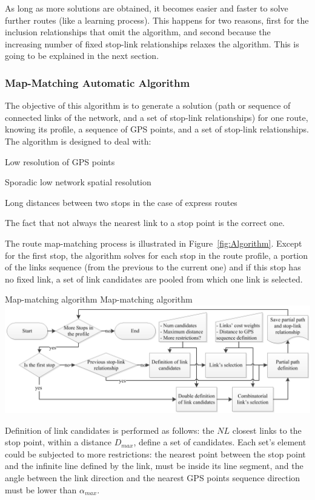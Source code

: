 As long as more solutions are obtained, it becomes easier and faster to solve further routes (like a learning process). This happens for two reasons, first for the inclusion relationships that omit the algorithm, and second because the increasing number of fixed stop-link relationships relaxes the algorithm. This is going to be explained in the next section.

\subsubsection{Map-Matching Automatic Algorithm}
The objective of this algorithm is to generate a solution (path or sequence of connected links of the network, and a set of stop-link relationships) for one route, knowing its profile, a sequence of GPS points, and a set of stop-link relationships. The algorithm is designed to deal with:
%
\begin{compactitem}
\item	Low resolution of GPS points
\item	Sporadic low network spatial resolution
\item	Long distances between two stops in the case of express routes
\item	The fact that not always the nearest link to a stop point is the correct one.
\end{compactitem}

The route map-matching process is illustrated in Figure~\ref{fig:Algorithm}. Except for the first stop, the algorithm solves for each stop in the route profile, a portion of the links sequence (from the previous to the current one) and if this stop has no fixed link, a set of link candidates are pooled from which one link is selected.

\createfigure
{Map-matching algorithm}
{Map-matching algorithm}
{\label{fig:Algorithm}}
{\includegraphics[width=1.0\textwidth]{extending/figures/semiAuto/Algorithm.png}}
{}

Definition of link candidates is performed as follows: the $NL$ closest links to the stop point, within a distance $D_{max}$, define a set of candidates. Each set's element could be subjected to more restrictions: the nearest point between the stop point and the infinite line defined by the link, must be inside its line segment, and the angle between the link direction and the nearest GPS points sequence direction must be lower than $\alpha_{max}$.

